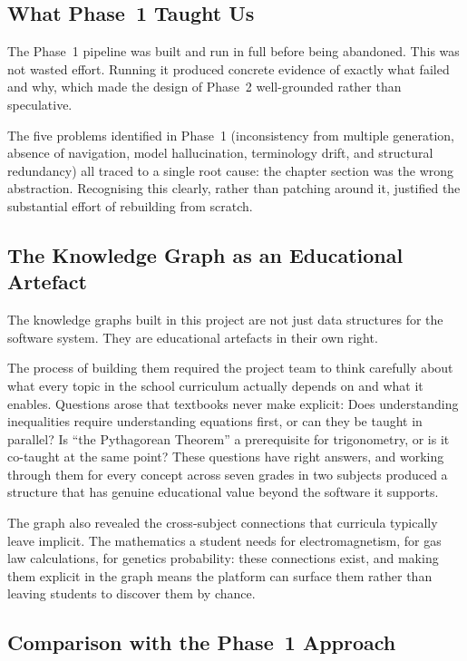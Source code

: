 \documentclass[12pt,a4paper]{article}
\begin{document}
\subsection{What Phase~1 Taught Us}

The Phase~1 pipeline was built and run in full before being abandoned.
This was not wasted effort.
Running it produced concrete evidence of exactly what failed and why,
which made the design of Phase~2 well-grounded rather than speculative.

The five problems identified in Phase~1 (inconsistency from multiple generation,
absence of navigation, model hallucination, terminology drift, and structural redundancy)
all traced to a single root cause: the chapter section was the wrong abstraction.
Recognising this clearly, rather than patching around it, justified the substantial
effort of rebuilding from scratch.

\subsection{The Knowledge Graph as an Educational Artefact}

The knowledge graphs built in this project are not just data structures for the software system.
They are educational artefacts in their own right.

The process of building them required the project team to think carefully about
what every topic in the school curriculum actually depends on and what it enables.
Questions arose that textbooks never make explicit:
Does understanding inequalities require understanding equations first,
or can they be taught in parallel?
Is ``the Pythagorean Theorem'' a prerequisite for trigonometry,
or is it co-taught at the same point?
These questions have right answers, and working through them for every concept across
seven grades in two subjects produced a structure that has genuine educational value
beyond the software it supports.

The graph also revealed the cross-subject connections that curricula typically
leave implicit.
The mathematics a student needs for electromagnetism, for gas law calculations,
for genetics probability: these connections exist, and making them explicit in the graph
means the platform can surface them rather than leaving students to discover them by chance.

\subsection{Comparison with the Phase~1 Approach}
\end{document}
